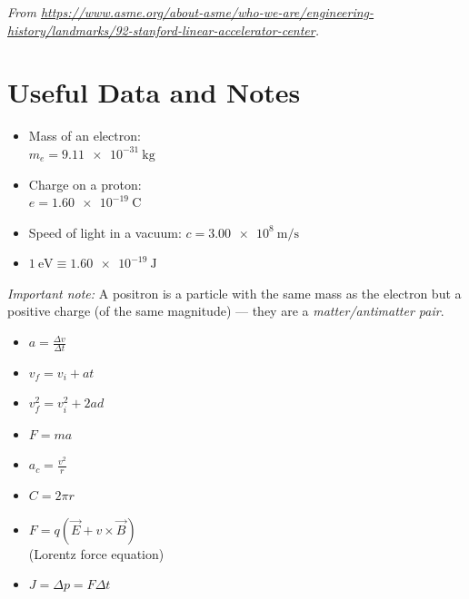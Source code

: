 \documentclass[a4paper]{exam}
\begin{document}
{\scriptsize\textit{From \url{https://www.asme.org/about-asme/who-we-are/engineering-history/landmarks/92-stanford-linear-accelerator-center}.}}

\section{Useful Data and Notes}
\begin{multicols}{3}
\begin{itemize}
  \item Mass of an electron:\\ $ m_e = \SI{9.11e-31}{\kilo\gram} $
  \item Charge on a proton:\\ $ e = \SI{1.60e-19}{\coulomb} $
  \item Speed of light in a vacuum: $ c = \SI{3.00e8}{\metre\per\second} $
  \item $ \SI{1}{\electronvolt} \equiv \SI{1.60e-19}{\joule} $
\end{itemize}

\textit{Important note:} A positron is a particle with the same mass as the electron but a positive charge (of the same magnitude) --- they are
a \textit{matter/antimatter pair}.

\begin{itemize}
  \item $ a = \frac{\Delta v}{\Delta t} $
  \item $ v_f = v_i + at $
  \item $ v_f^2 = v_i^2 + 2ad $
  \item $ F = ma $
  \item $ a_c = \frac{v^2}{r} $
  \item $ C = 2\pi r $
  \item $ F = q(\vec E + v \times \vec B) $\\ (Lorentz force equation)
  \item $ J = \Delta p = F \Delta t $
\end{itemize}
\end{multicols}
\end{document}
